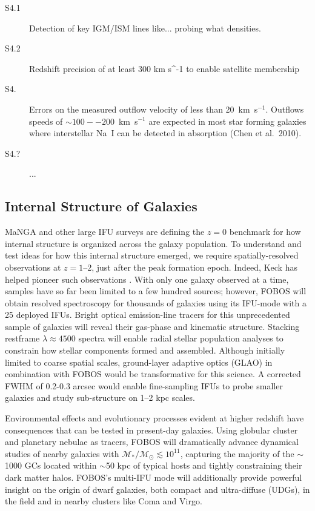 \documentclass[preprint,11pt]{aastex}
\newcommand{\kms}{{\rm km s^{-1}}}
\begin{document}
\begin{description}

\item[S4.1] Detection of key IGM/ISM lines like... probing what densities.

\item[S4.2] Redshift precision of at least 300 \kms{} to enable satellite membership


\item[S4.] Errors on the measured outflow velocity of less than
 20~km~s$^{-1}$.  Outflows speeds of $\sim100 -- 200$~km~s$^{-1}$ are
 expected in most star forming galaxies where interstellar Na~I can
 be detected in absorption (Chen et al.~2010).


\item[S4.?] ...


\end{description}


\subsection{Internal Structure of Galaxies}
\label{sec:content}

MaNGA \citep{bundy15} and other large IFU surveys are defining the
$z=0$ benchmark for how internal structure is organized across the
galaxy population. To understand and test ideas for how this internal
structure emerged, we require spatially-resolved observations at $z =
1$--2, just after the peak formation epoch. Indeed, Keck has
helped pioneer such observations \citep[e.g.,][]{erb04, miller11,law09}.
With only one galaxy observed at a time, samples have so far been limited to a few hundred sources; however,
FOBOS will obtain resolved spectroscopy for thousands of galaxies
using its IFU-mode with a 25 deployed IFUs. Bright optical emission-line tracers
for this unprecedented sample of galaxies will reveal their gas-phase
and kinematic structure. Stacking restframe $\lambda \approx 4500$
spectra will enable radial stellar population analyses to constrain
how stellar components formed and assembled. Although initially
limited to coarse spatial scales, ground-layer adaptive optics (GLAO)
in combination with FOBOS would be transformative for this science. A
corrected FWHM of 0.2-0.3 arcsec would enable fine-sampling IFUs to
probe smaller galaxies and study sub-structure on 1--2 kpc scales.

Environmental effects and evolutionary processes evident at higher redshift have consequences that can be tested in present-day galaxies.  Using globular cluster and planetary nebulae as tracers, FOBOS will
dramatically advance dynamical studies of nearby galaxies with
$\mathcal{M_\ast/M_\odot} \lesssim 10^{11}$, capturing the majority
of the $\sim$1000 GCs located within $\sim$50 kpc of typical hosts
\citep[see][]{2013ApJ...772...82H} and tightly constraining their
dark matter halos. FOBOS's multi-IFU mode will additionally provide
powerful insight on the origin of dwarf galaxies, both compact and
ultra-diffuse (UDGs), in the field and in nearby clusters like Coma
and Virgo.
\end{document}
